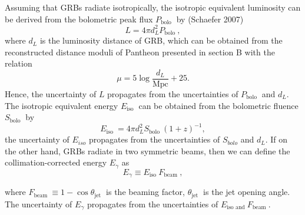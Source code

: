 Assuming that GRBs radiate isotropically, the isotropic equivalent luminosity can be derived from the bolometric peak flux $P_{\text {bolo }}$ by (Schaefer 2007)
$$
L=4 \pi d_{L}^{2} P_{\text {bolo }},
$$
where $d_{L}$ is the luminosity distance of GRB, which can be obtained from the reconstructed distance moduli of Pantheon presented in section B with the relation
$$
\mu=5 \log \frac{d_{L}}{\mathrm{Mpc}}+25 .
$$
Hence, the uncertainty of $L$ propagates from the uncertainties of $P_{\text {bolo }}$ and $d_{L}$. The isotropic equivalent energy $E_{\text {iso }}$ can be obtained from the bolometric fluence $S_{\text {bolo }}$ by
$$
E_{\text {iso }}=4 \pi d_{L}^{2} S_{\text {bolo }}(1+z)^{-1},
$$
the uncertainty of $E_{iso}$ propagates from the uncertainties of $S_{bolo}$ and $d_L$. If on the other hand, GRBs radiate in two symmetric beams, then we can define the collimation-corrected energy $E_{\gamma}$ as
$$
E_{\gamma} \equiv E_{\text {iso }} F_{\text {beam }},
$$

where $F_{\text {beam }} \equiv 1-\cos \theta_{\text {jet }}$ is the beaming factor, $\theta_{\text {jet }}$ is the jet opening angle. The uncertainty of $E_{\gamma}$ propagates from the uncertainties of $E_{\text {iso and }} F_{\text {beam }}$.
